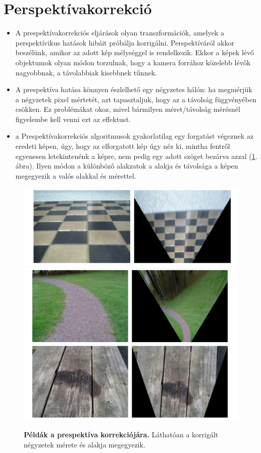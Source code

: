\documentclass[12pt]{article}
\theoremstyle{plain}
\begin{document}
\section{Perspektívakorrekció}
\begin{itemize}
    
\item A prespektívakorrekciós eljárások olyan transzformációk, amelyek a perspektívikus hatások hibáit próbálja korrigálni. Perspektíváról akkor beszélünk, amikor az adott kép mélységgel is rendelkezik. Ekkor a képek lévő objektumok olyan módon torzulnak, hogy a kamera forrához közelebb lévők nagyobbnak, a távolabbiak kisebbnek tűnnek. 

\item A prespektíva hatása könnyen észlelhető egy négyzetes hálón: ha megmérjük a négyzetek pixel mértetét, azt tapasztaljuk, hogy az a távolság függvényében csökken. Ez problémákat okoz, mivel bármilyen méret/távolság mérésnél figyelembe kell venni ezt az effektust.

\item a Prespektívakorrekciós algoritmusok gyakorlatilag egy forgatást végeznek az eredeti képen, úgy, hogy az elforgatott kép úgy néz ki, mintha fentről egyenesen letekintenénk a képre, nem pedig egy adott szöget bezárva azzal (\ref{fig:pers}. ábra). Ilyen módon a különböző alakzatok a alakja és távolsága a képen megegyezik a valós alakkal és mérettel.

\end{itemize}{}

\begin{figure}[H]
    \begin{center}
    \includegraphics[width=0.75\linewidth]{media/p1.png}
    \includegraphics[width=0.75\linewidth]{media/p2.png}
    \caption{\textbf{Példák a prespektíva korrekciójára.} Láthatóan a korrigált négyzetek mérete és alakja megegyezik.} 
    \label{fig:pers}
    \end{center}
\end{figure}
\end{document}
